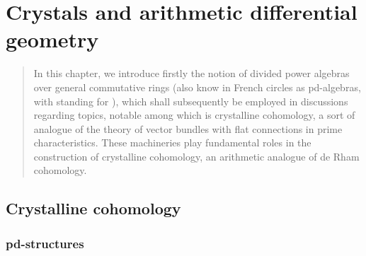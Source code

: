 \chapter{Crystals and arithmetic differential geometry} \label{chapter: crystals}
    \begin{abstract}
        In this chapter, we introduce firstly the notion of divided power algebras over general commutative rings (also know in French circles as pd-algebras, with  standing for ), which shall subsequently be employed in discussions regarding topics, notable among which is crystalline cohomology, a sort of analogue of the theory of vector bundles with flat connections in prime characteristics. These machineries play fundamental roles in the construction of crystalline cohomology, an arithmetic analogue of de Rham cohomology. 
    \end{abstract}
    
    \minitoc
    
    \section{Crystalline cohomology}
        \subsection{pd-structures}
